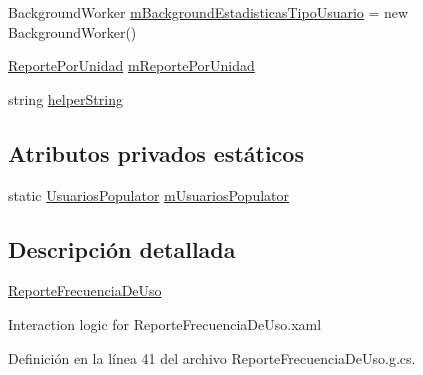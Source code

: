 \begin{DoxyCompactItemize}
\item 
Background\-Worker \hyperlink{class_proyecto___integrador__3_1_1_reportes_1_1_reporte_frecuencia_de_uso_a8d42c7455eb1b9669a3de163047f357f}{m\-Background\-Estadisticas\-Tipo\-Usuario} = new Background\-Worker()
\item 
\hyperlink{class_proyecto___integrador__3_1_1_reportes_1_1_reporte_por_unidad}{Reporte\-Por\-Unidad} \hyperlink{class_proyecto___integrador__3_1_1_reportes_1_1_reporte_frecuencia_de_uso_a0e61625363a522a2378ccd73b1ebbfb2}{m\-Reporte\-Por\-Unidad}
\item 
string \hyperlink{class_proyecto___integrador__3_1_1_reportes_1_1_reporte_frecuencia_de_uso_a445e3fd272881069a4fb7c71982c185b}{helper\-String}
\end{DoxyCompactItemize}
\subsection*{Atributos privados estáticos}
\begin{DoxyCompactItemize}
\item 
static \hyperlink{_main_window_8xaml_8cs_a9b6fea16165d9a40204bde2f9eb53148}{Usuarios\-Populator} \hyperlink{class_proyecto___integrador__3_1_1_reportes_1_1_reporte_frecuencia_de_uso_ad66e9ccc04488afa646ac2e65bf7db35}{m\-Usuarios\-Populator}
\end{DoxyCompactItemize}


\subsection{Descripción detallada}
\hyperlink{class_proyecto___integrador__3_1_1_reportes_1_1_reporte_frecuencia_de_uso}{Reporte\-Frecuencia\-De\-Uso} 

Interaction logic for Reporte\-Frecuencia\-De\-Uso.\-xaml 

Definición en la línea 41 del archivo Reporte\-Frecuencia\-De\-Uso.\-g.\-cs.



